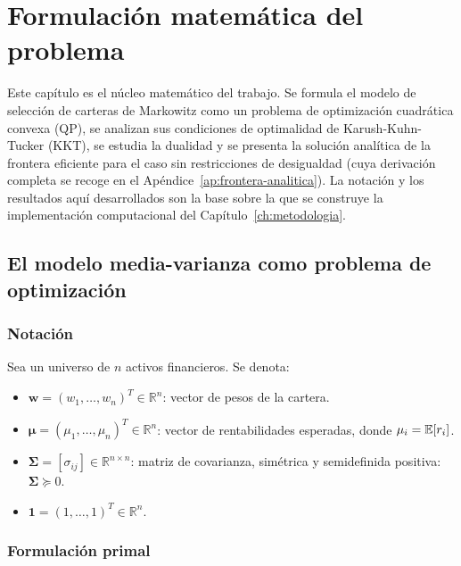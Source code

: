 \chapter{Formulación matemática del problema}
\label{ch:formulacion}

Este capítulo es el núcleo matemático del trabajo. Se formula
el modelo de selección de carteras de Markowitz como un problema de
optimización cuadrática convexa (QP), se analizan sus condiciones de
optimalidad de Karush-Kuhn-Tucker (KKT), se estudia la dualidad y se
presenta la solución analítica de la frontera eficiente para el caso sin
restricciones de desigualdad (cuya derivación completa se recoge en el
Apéndice~\ref{ap:frontera-analitica}). La notación y los resultados aquí
desarrollados son la base sobre la que se construye la implementación
computacional del Capítulo~\ref{ch:metodologia}.

\section{El modelo media-varianza como problema de optimización}

\subsection{Notación}

Sea un universo de $n$ activos financieros. Se denota:

\begin{itemize}
    \item $\mathbf{w} = (w_1, \dots, w_n)^T \in \mathbb{R}^n$: vector
          de pesos de la cartera.
    \item $\boldsymbol{\mu} = (\mu_1, \dots, \mu_n)^T \in \mathbb{R}^n$:
          vector de rentabilidades esperadas, donde $\mu_i = \mathbb{E}[r_i]$.
    \item $\boldsymbol{\Sigma} = [\sigma_{ij}] \in \mathbb{R}^{n \times n}$:
          matriz de covarianza, simétrica y semidefinida positiva:
          $\boldsymbol{\Sigma} \succeq 0$.
    \item $\mathbf{1} = (1, \dots, 1)^T \in \mathbb{R}^n$.
\end{itemize}

\subsection{Formulación primal}

